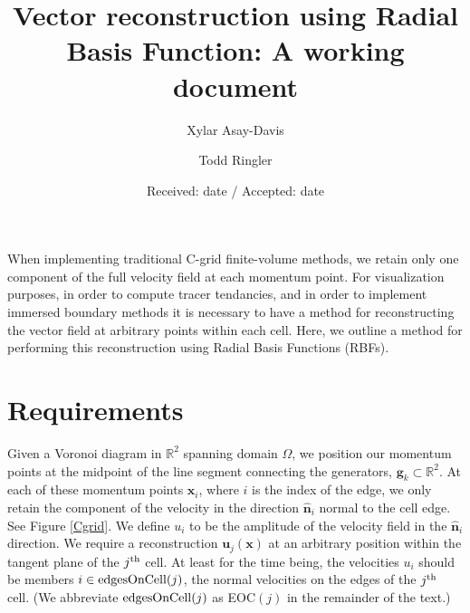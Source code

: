 \documentclass[onecolumn, referee]{svjour3}                     %
\begin{document}
\title{Vector reconstruction using Radial Basis Function: A working document}

\author{Xylar Asay-Davis \and Todd Ringler}



\date{Received: date / Accepted: date}

\maketitle

\abstract
When implementing traditional C-grid finite-volume methods, we retain only one component of the full velocity field at each momentum point.  For visualization purposes, in order to compute tracer tendancies, and in order to implement immersed boundary methods it is necessary to have a method for reconstructing the vector field at arbitrary points within each cell.  Here, we outline a method for performing this reconstruction using Radial Basis Functions (RBFs).


\section{Requirements}

Given a Voronoi diagram in $\mathbb{R}^2$ spanning domain $\Omega$, we position our momentum points at the midpoint of the line segment connecting the generators, $\bm{g}_k \subset \mathbb{R}^2$.  At each of these momentum points $\bm{x}_i$, where $i$ is the index of the edge, we only retain the component of the velocity in the direction $\bm{\hat{n}}_i$ normal to the cell edge. See Figure \ref{Cgrid}.  We define $u_i$ to be the amplitude of the velocity field in the $\bm{\hat{n}}_i$ direction.  We require a reconstruction $\bm{u}_j(\bm{x})$ at an arbitrary position within the tangent plane of the $j^{\rm th}$ cell.  At least for the time being, the velocities $u_i$ should be members $i \in {\rm edgesOnCell}(j)$, the normal velocities on the edges of the $j^{\rm th}$ cell. (We abbreviate ${\rm edgesOnCell}(j)$ as EOC$(j)$ in the remainder of the text.)
\end{document}
